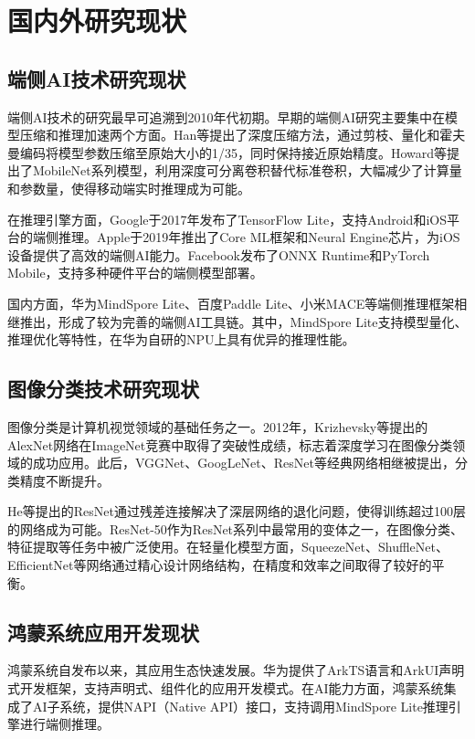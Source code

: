 \section{国内外研究现状}

\subsection{端侧AI技术研究现状}

端侧AI技术的研究最早可追溯到2010年代初期。早期的端侧AI研究主要集中在模型压缩和推理加速两个方面。Han等\cite{han2015deep}提出了深度压缩方法，通过剪枝、量化和霍夫曼编码将模型参数压缩至原始大小的1/35，同时保持接近原始精度。Howard等\cite{howard2017mobilenets}提出了MobileNet系列模型，利用深度可分离卷积替代标准卷积，大幅减少了计算量和参数量，使得移动端实时推理成为可能。

在推理引擎方面，Google于2017年发布了TensorFlow Lite，支持Android和iOS平台的端侧推理。Apple于2019年推出了Core ML框架和Neural Engine芯片，为iOS设备提供了高效的端侧AI能力。Facebook发布了ONNX Runtime和PyTorch Mobile，支持多种硬件平台的端侧模型部署\cite{wu2019machine}。

国内方面，华为MindSpore Lite、百度Paddle Lite、小米MACE等端侧推理框架相继推出，形成了较为完善的端侧AI工具链。其中，MindSpore Lite支持模型量化、推理优化等特性，在华为自研的NPU上具有优异的推理性能\cite{mindspore2021lite}。

\subsection{图像分类技术研究现状}

图像分类是计算机视觉领域的基础任务之一。2012年，Krizhevsky等\cite{krizhevsky2012imagenet}提出的AlexNet网络在ImageNet竞赛中取得了突破性成绩，标志着深度学习在图像分类领域的成功应用。此后，VGGNet、GoogLeNet、ResNet等经典网络相继被提出，分类精度不断提升。

He等\cite{he2016deep}提出的ResNet通过残差连接解决了深层网络的退化问题，使得训练超过100层的网络成为可能。ResNet-50作为ResNet系列中最常用的变体之一，在图像分类、特征提取等任务中被广泛使用。在轻量化模型方面，SqueezeNet、ShuffleNet、EfficientNet等网络通过精心设计网络结构，在精度和效率之间取得了较好的平衡。

\subsection{鸿蒙系统应用开发现状}

鸿蒙系统自发布以来，其应用生态快速发展。华为提供了ArkTS语言和ArkUI声明式开发框架，支持声明式、组件化的应用开发模式。在AI能力方面，鸿蒙系统集成了AI子系统，提供NAPI（Native API）接口，支持调用MindSpore Lite推理引擎进行端侧推理\cite{huawei2023arkts}。

